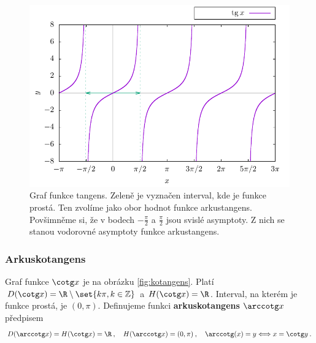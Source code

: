 \begin{figure}[H]
    \centering
    \includegraphics{Gnuplot/cv1/Figures/tangensgraf.pdf}
    \caption{Graf funkce tangens. Zeleně je vyznačen interval, kde je funkce prostá. Ten zvolíme jako obor hodnot funkce arkustangens. Povšimněme si, že v bodech $-\frac{\pi}{2}$ a $\frac{\pi}{2}$ jsou svislé asymptoty. Z nich se stanou vodorovné asymptoty funkce arkustangens.}
    \label{fig:tangens}
\end{figure}

\subsubsection*{Arkuskotangens}

Graf funkce $\cotg x$ je na obrázku \ref{fig:kotangens}. Platí $D(\cotg x) = \R \setminus \set{ k \pi, k \in \mathbb{Z}}$ a $H(\cotg x) = \R$. Interval, na kterém je funkce prostá, je $(0, \pi)$. Definujeme funkci \textbf{arkuskotangens} $\arccotg x$ předpisem 
\begin{align}
    D(\arccotg x) = H(\cotg x) = \R \:, \quad H(\arccotg x) = (0, \pi) \:, \quad \arccotg(x) = y \Longleftrightarrow x = \cotg y \:.
\end{align}

